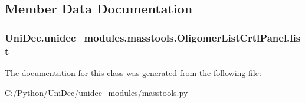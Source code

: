 \subsection{Member Data Documentation}
\hypertarget{class_uni_dec_1_1unidec__modules_1_1masstools_1_1_oligomer_list_crtl_panel_a5d49f16c7861b87b17102461031ca967}{}
\subsubsection[{list}]{\setlength{\rightskip}{0pt plus 5cm}Uni\+Dec.\+unidec\+\_\+modules.\+masstools.\+Oligomer\+List\+Crtl\+Panel.\+list}\label{class_uni_dec_1_1unidec__modules_1_1masstools_1_1_oligomer_list_crtl_panel_a5d49f16c7861b87b17102461031ca967}


The documentation for this class was generated from the following file\+:\begin{DoxyCompactItemize}
\item 
C\+:/\+Python/\+Uni\+Dec/unidec\+\_\+modules/\hyperlink{masstools_8py}{masstools.\+py}\end{DoxyCompactItemize}
